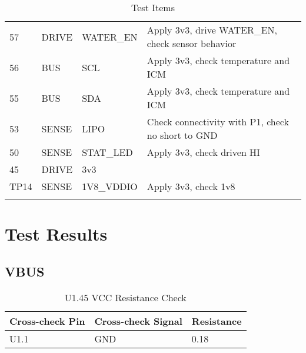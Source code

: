 \documentclass{article}
\begin{document}
\begin{table}[ht]
\begin{tabular}{@{}lllp{}@{}}
        57    & DRIVE     & WATER\_EN            & Apply 3v3, drive WATER\_EN, check sensor behavior                                                                                                                   \\
        56    & BUS       & SCL                  & Apply 3v3, check temperature and ICM                                                                                                                                \\
        55    & BUS       & SDA                  & Apply 3v3, check temperature and ICM                                                                                                                                \\
        53    & SENSE     & LIPO                 & Check connectivity with P1, check no short to GND                                                                                                                   \\
        50    & SENSE     & STAT\_LED            & Apply 3v3, check driven HI                                                                                                                                          \\
        45    & DRIVE     & 3v3                  &                                                                                                                                                                     \\
        TP14  & SENSE     & 1V8\_VDDIO           & Apply 3v3, check 1v8                                                                                                                                                \\ \bottomrule                                         \\ \bottomrule
    \end{tabular}
    \caption{Test Items}
    \label{tab:test_table}
\end{table}
\section{Test Results}
\subsection{VBUS}
\begin{table}[ht]
    \centering
    \begin{tabular}{@{}lll@{}}
        \toprule
        Cross-check Pin & Cross-check Signal & Resistance \\ \midrule
        U1.1            & GND                & 0.18       \\ \bottomrule
    \end{tabular}
    \caption{U1.45 VCC Resistance Check}
    \label{tab:u1_45_resistance}
\end{table}
\end{document}
